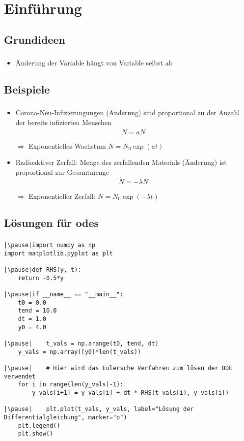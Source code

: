 \section{Einführung}
\label{sec:Introduction}


\subsection{Grundideen}
\label{subsec:basic-concepts}
\begin{frame}
	\frametitle{\insertsubsection}
	\begin{itemize}[<+->]
		\item Änderung der Variable hängt von Variable selbst ab

	\end{itemize}
\end{frame}


\subsection{Beispiele}
\label{subsec:examples}
\begin{frame}
    \frametitle{\insertsubsection}
    \begin{itemize}[<+->]
        \item Corona-Neu-Infizierungungen (Änderung) sind proportional zu der Anzahl der bereits infizierten Menschen
        \[\dot{N} = a N\]
        \item[$\Rightarrow$] Exponentielles Wachstum $N=N_0\exp(at)$
        \item Radioaktiver Zerfall: Menge des zerfallenden Materials (Änderung) ist proportional zur Gesamtmenge
        \[\dot{N} = -\lambda N\]
        \item[$\Rightarrow$] Exponentieller Zerfall: $N=N_0\exp(-\lambda t)$
    \end{itemize}
\end{frame}


\subsection{Lösungen für \acsp{ode}}
\label{subsec:solving}
\begin{frame}[fragile]
    \frametitle{\insertsubsection}
    \begin{verbatim}
|\pause|import numpy as np
import matplotlib.pyplot as plt

|\pause|def RHS(y, t):
    return -0.5*y

|\pause|if __name__ == "__main__":
    t0 = 0.0
    tend = 10.0
    dt = 1.0
    y0 = 4.0

|\pause|    t_vals = np.arange(t0, tend, dt)
    y_vals = np.array([y0]*len(t_vals))

|\pause|    # Hier wird das Eulersche Verfahren zum lösen der ODE verwendet
    for i in range(len(y_vals)-1):
        y_vals[i+1] = y_vals[i] + dt * RHS(t_vals[i], y_vals[i])

|\pause|    plt.plot(t_vals, y_vals, label="Lösung der Differentialgleichung", marker="o")
    plt.legend()
    plt.show()
	\end{verbatim}
\end{frame}


